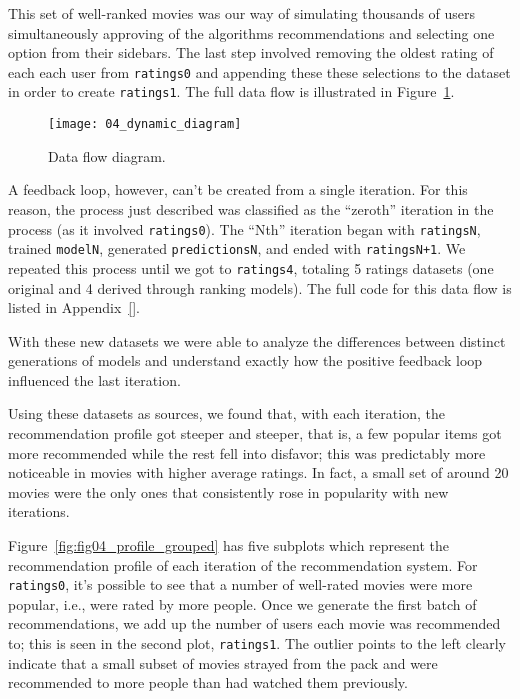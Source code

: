 This set of well-ranked movies was our way of simulating thousands of users
simultaneously approving of the algorithms recommendations and selecting one
option from their sidebars. The last step involved removing the oldest rating of
each each user from \verb|ratings0| and appending these these selections to the
dataset in order to create \verb|ratings1|. The full data flow is illustrated
in Figure~\ref{fig:fig04_dynamic_diagram}.

\begin{figure}
  \centering
  \texttt{[image: 04\_dynamic\_diagram]}
  \caption{Data flow diagram.\label{fig:fig04_dynamic_diagram}}
\end{figure}

A feedback loop, however, can't be created from a single iteration. For this
reason, the process just described was classified as the ``zeroth'' iteration in
the process (as it involved \verb|ratings0|). The ``Nth'' iteration began with
\verb|ratingsN|, trained \verb|modelN|, generated \verb|predictionsN|, and ended
with \verb|ratingsN+1|. We repeated this process until we got to
\verb|ratings4|, totaling 5 ratings datasets (one original and 4 derived through
ranking models). The full code for this data flow is listed in Appendix~\ref{}.

With these new datasets we were able to analyze the differences between distinct
generations of models and understand exactly how the positive feedback loop
influenced the last iteration.

Using these datasets as sources, we found that, with each iteration, the
recommendation profile got steeper and steeper, that is, a few popular items got
more recommended while the rest fell into disfavor; this was predictably more
noticeable in movies with higher average ratings. In fact, a small set of around
20 movies were the only ones that consistently rose in popularity with new
iterations.

Figure~\ref{fig:fig04_profile_grouped} has five subplots which represent the
recommendation profile of each iteration of the recommendation system. For
\verb|ratings0|, it's possible to see that a number of well-rated movies were
more popular, i.e., were rated by more people. Once we generate the first batch
of recommendations, we add up the number of users each movie was recommended to;
this is seen in the second plot, \verb|ratings1|. The outlier points to the left
clearly indicate that a small subset of movies strayed from the pack and were
recommended to more people than had watched them previously.

